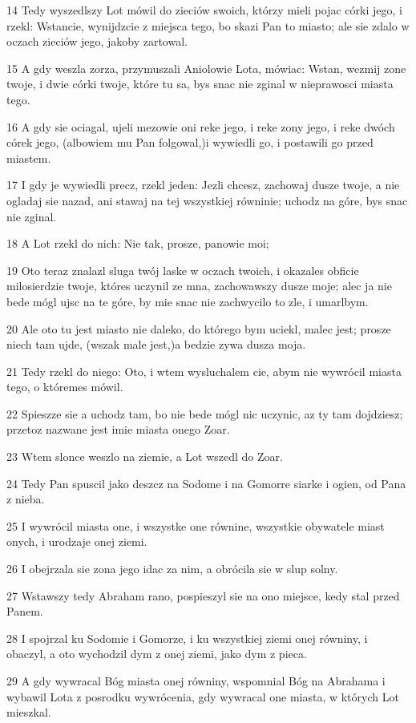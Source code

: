 \par 14 Tedy wyszedlszy Lot mówil do zieciów swoich, którzy mieli pojac córki jego, i rzekl: Wstancie, wynijdzcie z miejsca tego, bo skazi Pan to miasto; ale sie zdalo w oczach zieciów jego, jakoby zartowal.
\par 15 A gdy weszla zorza, przymuszali Aniolowie Lota, mówiac: Wstan, wezmij zone twoje, i dwie córki twoje, które tu sa, bys snac nie zginal w nieprawosci miasta tego.
\par 16 A gdy sie ociagal, ujeli mezowie oni reke jego, i reke zony jego, i reke dwóch córek jego, (albowiem mu Pan folgowal,)i wywiedli go, i postawili go przed miastem.
\par 17 I gdy je wywiedli precz, rzekl jeden: Jezli chcesz, zachowaj dusze twoje, a nie ogladaj sie nazad, ani stawaj na tej wszystkiej równinie; uchodz na góre, bys snac nie zginal.
\par 18 A Lot rzekl do nich: Nie tak, prosze, panowie moi;
\par 19 Oto teraz znalazl sluga twój laske w oczach twoich, i okazales obficie milosierdzie twoje, któres uczynil ze mna, zachowawszy dusze moje; alec ja nie bede mógl ujsc na te góre, by mie snac nie zachwycilo to zle, i umarlbym.
\par 20 Ale oto tu jest miasto nie daleko, do którego bym uciekl, malec jest; prosze niech tam ujde, (wszak male jest,)a bedzie zywa dusza moja.
\par 21 Tedy rzekl do niego: Oto, i wtem wysluchalem cie, abym nie wywrócil miasta tego, o któremes mówil.
\par 22 Spieszze sie a uchodz tam, bo nie bede mógl nic uczynic, az ty tam dojdziesz; przetoz nazwane jest imie miasta onego Zoar.
\par 23 Wtem slonce weszlo na ziemie, a Lot wszedl do Zoar.
\par 24 Tedy Pan spuscil jako deszcz na Sodome i na Gomorre siarke i ogien, od Pana z nieba.
\par 25 I wywrócil miasta one, i wszystke one równine, wszystkie obywatele miast onych, i urodzaje onej ziemi.
\par 26 I obejrzala sie zona jego idac za nim, a obrócila sie w slup solny.
\par 27 Wstawszy tedy Abraham rano, pospieszyl sie na ono miejsce, kedy stal przed Panem.
\par 28 I spojrzal ku Sodomie i Gomorze, i ku wszystkiej ziemi onej równiny, i obaczyl, a oto wychodzil dym z onej ziemi, jako dym z pieca.
\par 29 A gdy wywracal Bóg miasta onej równiny, wspomnial Bóg na Abrahama i wybawil Lota z posrodku wywrócenia, gdy wywracal one miasta, w których Lot mieszkal.
